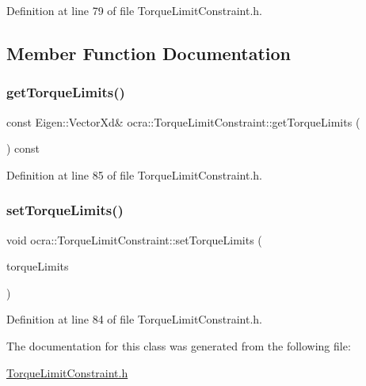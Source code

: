 Definition at line 79 of file Torque\+Limit\+Constraint.\+h.



\subsection{Member Function Documentation}
\hypertarget{classocra_1_1TorqueLimitConstraint_a34f89a0c633bf6a8cabf79f9d6d22871}{}\label{classocra_1_1TorqueLimitConstraint_a34f89a0c633bf6a8cabf79f9d6d22871} 
\subsubsection{\texorpdfstring{get\+Torque\+Limits()}{getTorqueLimits()}}
{\footnotesize\ttfamily const Eigen\+::\+Vector\+Xd\& ocra\+::\+Torque\+Limit\+Constraint\+::get\+Torque\+Limits (\begin{DoxyParamCaption}{ }\end{DoxyParamCaption}) const\hspace{0.3cm}{\ttfamily [inline]}}



Definition at line 85 of file Torque\+Limit\+Constraint.\+h.

\hypertarget{classocra_1_1TorqueLimitConstraint_aae5d3c15e07731fb19f2f55b45852554}{}\label{classocra_1_1TorqueLimitConstraint_aae5d3c15e07731fb19f2f55b45852554} 
\subsubsection{\texorpdfstring{set\+Torque\+Limits()}{setTorqueLimits()}}
{\footnotesize\ttfamily void ocra\+::\+Torque\+Limit\+Constraint\+::set\+Torque\+Limits (\begin{DoxyParamCaption}\item[{const Eigen\+::\+Vector\+Xd \&}]{torque\+Limits }\end{DoxyParamCaption})\hspace{0.3cm}{\ttfamily [inline]}}



Definition at line 84 of file Torque\+Limit\+Constraint.\+h.



The documentation for this class was generated from the following file\+:\begin{DoxyCompactItemize}
\item 
\hyperlink{TorqueLimitConstraint_8h}{Torque\+Limit\+Constraint.\+h}\end{DoxyCompactItemize}
